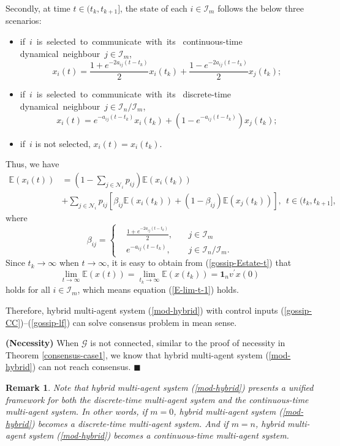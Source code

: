 \documentclass[12pt,draftcls,onecolumn]{IEEEtran}
\newtheorem{remark}{Remark}
\begin{document}
Secondly, at time $t\in(t_k,t_{k+1}]$, the state of each $i\in \mathcal{I}_m$ follows the below three scenarios:
\begin{itemize}
  \item if~$i$~is~selected~to~communicate~with~its~ continuous-time dynamical~neighbour~$j\in \mathcal{I}_m$, $$x_i(t)=\frac{1+e^{-2a_{ij}(t-t_k)}}{2}x_i(t_{k})+\frac{1-e^{-2a_{ij}(t-t_k)}}{2}x_j(t_{k});$$
  \item if~$i$~is~selected~to~communicate~with~its~ discrete-time dynamical~neighbour~$j\in \mathcal{I}_{n}/\mathcal{I}_{m}$,
  $$x_i(t)=e^{-a_{ij}(t-t_k)}x_i(t_k)+(1-e^{-a_{ij}(t-t_k)})x_j(t_k);$$
  \item if~$i$ is not selected, $x_i(t)=x_i(t_k).$
\end{itemize}
Thus, we have
\begin{equation}\label{gossip-Estate-t}
\begin{aligned}
 \mathbb{E}(x_i(t))&=\left(1-\sum_{j\in \mathscr{N}_{i}}p_{ij}\right) \mathbb{E}(x_i(t_k))\\
 &+\sum_{j\in \mathscr{N}_{i}}p_{ij}\left[\beta_{ij} \mathbb{E}(x_i(t_k))+(1-\beta_{ij}) \mathbb{E}(x_j(t_k))\right],~~t\in(t_k,t_{k+1}],
 \end{aligned}
\end{equation}
where
$$
\beta_{ij}=\left\{
\begin{aligned}
&\frac{1+e^{-2a_{ij}(t-t_k)}}{2},~&&j\in \mathcal{I}_m\\
&e^{-a_{ij}(t-t_k)},~&&j\in \mathcal{I}_{n}/\mathcal{I}_{m}.
\end{aligned}
\right.
$$
Since $t_k\rightarrow \infty$ when $t\rightarrow \infty$, it is easy to obtain from (\ref{gossip-Estate-t}) that
$$\lim_{t\rightarrow\infty}\mathbb{E}(x(t))=\lim_{t_k\rightarrow\infty}\mathbb{E}(x(t_{k}))=\mathbf{1}_nv^{'}x(0)$$
holds for all $i\in \mathcal{I}_m$, which means equation (\ref{E-lim-t-1}) holds.

Therefore, hybrid multi-agent system (\ref{mod-hybrid}) with control inputs (\ref{gossip-CC})--(\ref{gossip-lf}) can solve consensus problem in mean sense.

\textbf{(Necessity)} When $\mathscr{G}$ is not connected, similar to the proof of necessity in Theorem \ref{consensus-case1}, we know that hybrid multi-agent system (\ref{mod-hybrid}) can not reach consensus. $\blacksquare$




\begin{remark}\label{unified}
Note that hybrid multi-agent system (\ref{mod-hybrid}) presents a unified framework for both the discrete-time multi-agent system and the continuous-time multi-agent system. In other words, if $m=0$, hybrid multi-agent system (\ref{mod-hybrid}) becomes a discrete-time multi-agent system. And if $m=n$, hybrid multi-agent system (\ref{mod-hybrid}) becomes a continuous-time multi-agent system.
\end{remark}
\end{document}

